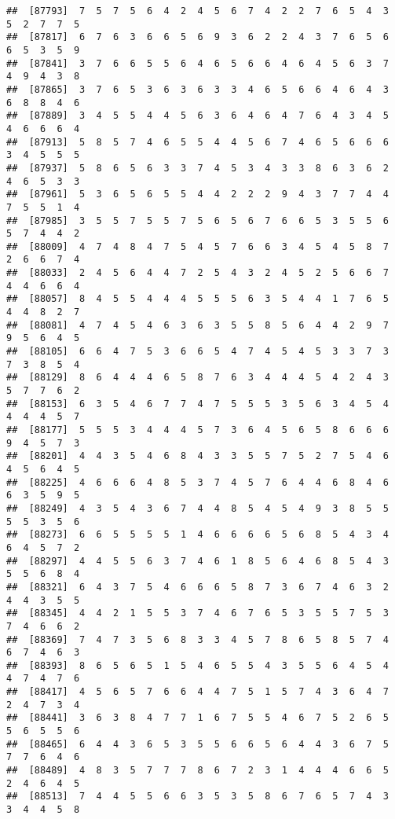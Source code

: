 \documentclass[
]{book}
\begin{document}
\begin{verbatim}
##  [87793]  7  5  7  5  6  4  2  4  5  6  7  4  2  2  7  6  5  4  3  5  2  7  7  5
##  [87817]  6  7  6  3  6  6  5  6  9  3  6  2  2  4  3  7  6  5  6  6  5  3  5  9
##  [87841]  3  7  6  6  5  5  6  4  6  5  6  6  4  6  4  5  6  3  7  4  9  4  3  8
##  [87865]  3  7  6  5  3  6  3  6  3  3  4  6  5  6  6  4  6  4  3  6  8  8  4  6
##  [87889]  3  4  5  5  4  4  5  6  3  6  4  6  4  7  6  4  3  4  5  4  6  6  6  4
##  [87913]  5  8  5  7  4  6  5  5  4  4  5  6  7  4  6  5  6  6  6  3  4  5  5  5
##  [87937]  5  8  6  5  6  3  3  7  4  5  3  4  3  3  8  6  3  6  2  4  6  5  3  3
##  [87961]  5  3  6  5  6  5  5  4  4  2  2  2  9  4  3  7  7  4  4  7  5  5  1  4
##  [87985]  3  5  5  7  5  5  7  5  6  5  6  7  6  6  5  3  5  5  6  5  7  4  4  2
##  [88009]  4  7  4  8  4  7  5  4  5  7  6  6  3  4  5  4  5  8  7  2  6  6  7  4
##  [88033]  2  4  5  6  4  4  7  2  5  4  3  2  4  5  2  5  6  6  7  4  4  6  6  4
##  [88057]  8  4  5  5  4  4  4  5  5  5  6  3  5  4  4  1  7  6  5  4  4  8  2  7
##  [88081]  4  7  4  5  4  6  3  6  3  5  5  8  5  6  4  4  2  9  7  9  5  6  4  5
##  [88105]  6  6  4  7  5  3  6  6  5  4  7  4  5  4  5  3  3  7  3  7  3  8  5  4
##  [88129]  8  6  4  4  4  6  5  8  7  6  3  4  4  4  5  4  2  4  3  5  7  7  6  2
##  [88153]  6  3  5  4  6  7  7  4  7  5  5  5  3  5  6  3  4  5  4  4  4  4  5  7
##  [88177]  5  5  5  3  4  4  4  5  7  3  6  4  5  6  5  8  6  6  6  9  4  5  7  3
##  [88201]  4  4  3  5  4  6  8  4  3  3  5  5  7  5  2  7  5  4  6  4  5  6  4  5
##  [88225]  4  6  6  6  4  8  5  3  7  4  5  7  6  4  4  6  8  4  6  6  3  5  9  5
##  [88249]  4  3  5  4  3  6  7  4  4  8  5  4  5  4  9  3  8  5  5  5  5  3  5  6
##  [88273]  6  6  5  5  5  5  1  4  6  6  6  6  5  6  8  5  4  3  4  6  4  5  7  2
##  [88297]  4  4  5  5  6  3  7  4  6  1  8  5  6  4  6  8  5  4  3  5  5  6  8  4
##  [88321]  6  4  3  7  5  4  6  6  6  5  8  7  3  6  7  4  6  3  2  4  4  3  5  5
##  [88345]  4  4  2  1  5  5  3  7  4  6  7  6  5  3  5  5  7  5  3  7  4  6  6  2
##  [88369]  7  4  7  3  5  6  8  3  3  4  5  7  8  6  5  8  5  7  4  6  7  4  6  3
##  [88393]  8  6  5  6  5  1  5  4  6  5  5  4  3  5  5  6  4  5  4  4  7  4  7  6
##  [88417]  4  5  6  5  7  6  6  4  4  7  5  1  5  7  4  3  6  4  7  2  4  7  3  4
##  [88441]  3  6  3  8  4  7  7  1  6  7  5  5  4  6  7  5  2  6  5  5  6  5  5  6
##  [88465]  6  4  4  3  6  5  3  5  5  6  6  5  6  4  4  3  6  7  5  7  7  6  4  6
##  [88489]  4  8  3  5  7  7  7  8  6  7  2  3  1  4  4  4  6  6  5  2  4  6  4  5
##  [88513]  7  4  4  5  5  6  6  3  5  3  5  8  6  7  6  5  7  4  3  3  4  4  5  8

\end{verbatim}
\end{document}
